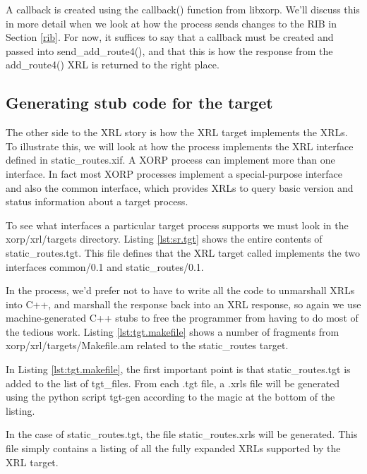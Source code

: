 \documentclass[11pt]{article}
\begin{document}
A callback is created using the {\stt callback()} function from
libxorp.  We'll discuss this in more detail when we look at how the
\SRI process sends changes to the RIB in Section \ref{rib}.  For now,
it suffices to say that a callback must be created and passed into
{\stt send\_add\_route4()}, and that this is how the response from the
{\stt add\_route4()} XRL is returned to the right place.

\newpage

\subsection{Generating stub code for the target}

The other side to the XRL story is how the XRL target implements the
XRLs.  To illustrate this, we will look at how the \SRI process
implements the XRL interface defined in {\stt static\_routes.xif}.
A XORP process can implement more than one interface.  In fact most
XORP processes implement a special-purpose interface and also the
{\stt common} interface, which provides XRLs to query basic version
and status information about a target process.

\vspace{0.1in}
To see what interfaces a particular target process supports we must
look in the {\stt xorp/xrl/targets} directory.  Listing
\ref{lst:sr.tgt} shows the entire contents of {\stt
static\_routes.tgt}.
This file defines that the XRL target called \SR implements the two
interfaces {\stt common/0.1} and {\stt static\_routes/0.1}.

In the \SRI process, we'd prefer not to have to write all the code to
unmarshall XRLs into C++, and marshall the response back into an XRL
response, so again we use machine-generated C++ stubs to free the
programmer from having to do most of the tedious work.  Listing
\ref{lst:tgt.makefile} shows a number of fragments from {\stt
xorp/xrl/targets/Makefile.am} related to the {\stt static\_routes}
target.


In Listing \ref{lst:tgt.makefile}, the first important point is that
{\stt static\_routes.tgt} is added to the list of {\stt tgt\_files}.
From each {\stt .tgt} file, a {\stt .xrls} file will be generated
using the python script {\stt tgt-gen} according to the magic at the
bottom of the listing.

In the case of {\stt static\_routes.tgt}, the file {\stt
static\_routes.xrls} will be generated.  This file simply contains a
listing of all the fully expanded XRLs supported by the \SR XRL
target.
\end{document}
